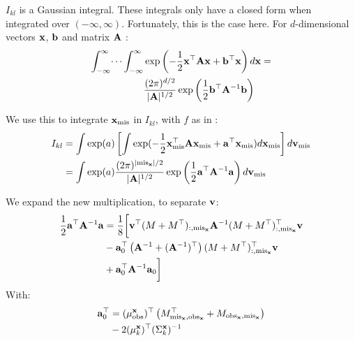 \documentclass[letterpaper]{article}
\newcommand{\tp}{\top}
\newcommand{\vx}{{\bf x}}
\newcommand{\vv}{{\bf v}}
\newcommand{\va}{{\bf a}}
\newcommand{\vA}{{\bf A}}
\newcommand{\vb}{{\bf b}}
\newcommand{\mis}{\text{mis}}
\newcommand{\obs}{\text{obs}}
\newcommand{\misx}{{\text{mis}_\vx}}
\newcommand{\obsx}{{\text{obs}_\vx}}
\begin{document}
$I_{kl}$ is a Gaussian integral. These integrals only have a closed form when
integrated over $(-\infty, \infty)$. Fortunately, this is the case here.
For $d$-dimensional vectors $\vx$, $\vb$ and matrix $\vA$
\citep[Equation~11]{straub2009brief}:
\begin{equation}
  \begin{aligned}
\int_{-\infty}^\infty \dots \int_{-\infty}^\infty &\exp\left(-\frac{1}{2}\vx^\tp\vA\vx + \vb^\tp\vx\right) d\vx = \\
&\frac{(2\pi)^{d/2}}{|\vA|^{1/2}} \exp \left(\frac{1}{2} \vb^\tp \vA^{-1}\vb \right)
  \end{aligned}
  \label{eq:gaussian-integral}
\end{equation}

We use this to integrate $\vx_\mis$ in $I_{kl}$, with $f$ as in :
\begin{equation*}
  \begin{aligned}
  I_{kl} &= \int \exp(a) \left[ \int \exp(-\frac{1}{2}\vx_\mis^\tp \vA \vx_\mis + \va^\tp \vx_\mis) d\vx_\mis \right] d\vv_\mis \\
    &= \int \exp(a) \frac{(2\pi)^{|\misx|/2}}{|\vA|^{1/2}} \exp \left(\frac{1}{2} \va^\tp \vA^{-1}\va \right) d\vv_\mis
  \end{aligned}
\end{equation*}

We expand the new multiplication, to separate $\vv$:
\begin{equation*}
\begin{aligned}
  \frac{1}{2} \va^\tp \vA^{-1} \va &= \frac{1}{8}\bigg[
  \vv^\tp(M + M^\tp)_{:,\misx} \vA^{-1} (M + M^\tp)_{:,\misx}^\tp\vv \\
  &- \va_0^\tp \left(\vA^{-1} + (\vA^{-1})^\tp\right) (M + M^\tp)_{:,\misx}^\tp \vv \\
  &+ \va_0^\tp\vA^{-1}\va_0 \bigg] 
\end{aligned}
\end{equation*}
With:
\begin{equation*}
\begin{aligned}
  \va_0^\tp &= (\mu^\vx_\obs)^\tp \left(M_{\misx,\obsx}^\tp + M_{\obsx,\misx} \right) \\
&- 2(\mu_k^\vx)^\tp (\Sigma_k^\vx)^{-1}
\end{aligned}
\end{equation*}
\end{document}
